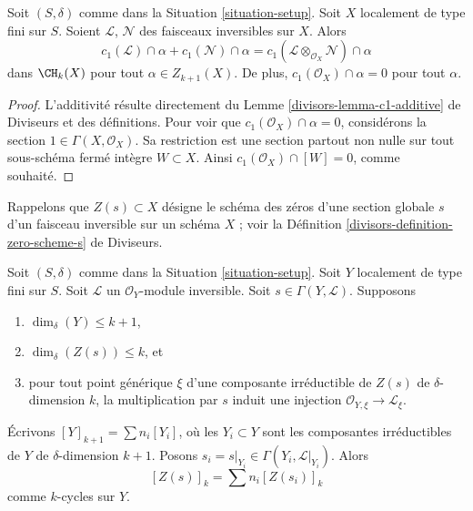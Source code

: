 \begin{lemma}
\label{lemma-c1-cap-additive}
Soit $(S, \delta)$ comme dans la Situation \ref{situation-setup}.
Soit $X$ localement de type fini sur $S$.
Soient $\mathcal{L}$, $\mathcal{N}$ des faisceaux inversibles sur $X$.
Alors
$$
c_1(\mathcal{L}) \cap \alpha  + c_1(\mathcal{N}) \cap \alpha =
c_1(\mathcal{L} \otimes_{\mathcal{O}_X} \mathcal{N}) \cap \alpha
$$
dans $\CH_k(X)$ pour tout $\alpha \in Z_{k + 1}(X)$. De plus,
$c_1(\mathcal{O}_X) \cap \alpha = 0$ pour tout $\alpha$.
\end{lemma}

\begin{proof}
L'additivité résulte directement du
Lemme \ref{divisors-lemma-c1-additive} de Diviseurs
et des définitions. Pour voir que $c_1(\mathcal{O}_X) \cap \alpha = 0$,
considérons la section $1 \in \Gamma(X, \mathcal{O}_X)$. Sa restriction
est une section partout non nulle sur tout sous-schéma fermé intègre
$W \subset X$. Ainsi $c_1(\mathcal{O}_X) \cap [W] = 0$, comme souhaité.
\end{proof}

\noindent
Rappelons que $Z(s) \subset X$ désigne le schéma des zéros d'une section globale
$s$ d'un faisceau inversible sur un schéma $X$ ; voir la
Définition \ref{divisors-definition-zero-scheme-s} de Diviseurs.

\begin{lemma}
\label{lemma-prepare-geometric-cap}
Soit $(S, \delta)$ comme dans la Situation \ref{situation-setup}.
Soit $Y$ localement de type fini sur $S$.
Soit $\mathcal{L}$ un $\mathcal{O}_Y$-module inversible.
Soit $s \in \Gamma(Y, \mathcal{L})$.
Supposons
\begin{enumerate}
\item $\dim_\delta(Y) \leq k + 1$,
\item $\dim_\delta(Z(s)) \leq k$, et
\item pour tout point générique $\xi$ d'une composante irréductible de
$Z(s)$ de $\delta$-dimension $k$, la multiplication par $s$
induit une injection $\mathcal{O}_{Y, \xi} \to \mathcal{L}_\xi$.
\end{enumerate}
Écrivons $[Y]_{k + 1} = \sum n_i[Y_i]$, où les $Y_i \subset Y$ sont les
composantes irréductibles de $Y$ de $\delta$-dimension $k + 1$.
Posons $s_i = s|_{Y_i} \in \Gamma(Y_i, \mathcal{L}|_{Y_i})$. Alors
\begin{equation}
\label{equation-equal-as-cycles}
[Z(s)]_k =  \sum n_i[Z(s_i)]_k
\end{equation}
comme $k$-cycles sur $Y$.
\end{lemma}

